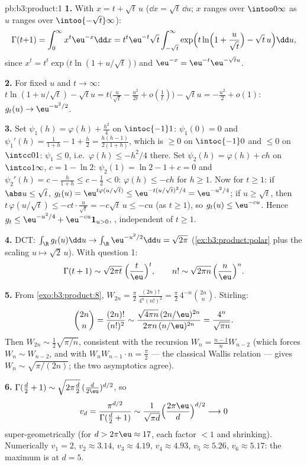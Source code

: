 \begin{solution}{pb:b3:product:1}
\textbf{1.} With $x = t + \sqrt t\,u$ ($\dd x = \sqrt
t\,\dd u$; $x$ ranges over $\intoo0\infty$ as $u$ ranges over
$\intoo{-\sqrt t}\infty$):
\[
\Gamma(t{+}1) = \int_0^\infty x^t\eu^{-x}\dd x
= t^t\eu^{-t}\sqrt t\int_{-\sqrt t}^{\infty}
\exp\Bigl(t\ln\Bigl(1 + \frac u{\sqrt t}\Bigr) - \sqrt
t\,u\Bigr)\dd u,
\]
since $x^t = t^t\exp\bigl(t\ln(1 + u/\sqrt t)\bigr)$ and
$\eu^{-x} = \eu^{-t}\eu^{-\sqrt tu}$.

\textbf{2.} For fixed $u$ and $t \to \infty$: $t\ln(1 +
u/\sqrt t) - \sqrt tu = t\bigl(\frac u{\sqrt t} -
\frac{u^2}{2t} + o(\frac1t)\bigr) - \sqrt tu = -\frac{u^2}2 +
o(1)$: $g_t(u) \to \eu^{-u^2/2}$.

\textbf{3.} Set $\psi_1(h) = \varphi(h) + \frac{h^2}4$ on
$\intoc{-1}1$: $\psi_1(0) = 0$ and $\psi_1'(h) = \frac1{1+h} -
1 + \frac h2 = \frac{h(h-1)}{2(1+h)}$, which is $\geq 0$ on
$\intoc{-1}0$ and $\leq 0$ on $\intcc01$: $\psi_1 \leq 0$,
i.e.\ $\varphi(h) \leq -h^2/4$ there. Set $\psi_2(h) =
\varphi(h) + ch$ on $\intco1\infty$, $c = 1 - \ln2$: $\psi_2(1)
= \ln2 - 1 + c = 0$ and $\psi_2'(h) = c - \frac h{1+h} \leq c -
\frac12 < 0$: $\varphi(h) \leq -ch$ for $h \geq 1$. Now for $t
\geq 1$: if $\abs u \leq \sqrt t$, $g_t(u) =
\eu^{t\varphi(u/\sqrt t)} \leq \eu^{-t(u/\sqrt t)^2/4} =
\eu^{-u^2/4}$; if $u \geq \sqrt t$, then $t\,\varphi(u/\sqrt t) \leq
-ct\cdot\frac u{\sqrt t} = -c\sqrt t\,u \leq -cu$ (as $t \geq
1$), so $g_t(u) \leq \eu^{-cu}$. Hence $g_t \leq \eu^{-u^2/4} +
\eu^{-cu}\mathbf 1_{u>0}$, , independent of $t \geq
1$.

\textbf{4.} DCT: $\int_\R g_t(u)\dd u \to
\int_\R\eu^{-u^2/2}\dd u = \sqrt{2\pi}$
(\cref{ex:b3:product:polar} plus the scaling
$u\mapsto\sqrt2\,u$). With question 1:
\[
\Gamma(t + 1) \sim \sqrt{2\pi t}\;\Bigl(\frac
t\eu\Bigr)^t,\qquad
n! \sim \sqrt{2\pi n}\,\Bigl(\frac n\eu\Bigr)^n .
\]

\textbf{5.} From \cref{exo:b3:product:8}, $W_{2n} =
\frac\pi2\,\frac{(2n)!}{4^n(n!)^2} =
\frac\pi2\,4^{-n}\binom{2n}n$. Stirling:
\[
\binom{2n}{n} = \frac{(2n)!}{(n!)^2}
\sim \frac{\sqrt{4\pi n}\,(2n/\eu)^{2n}}
{2\pi n\,(n/\eu)^{2n}} = \frac{4^n}{\sqrt{\pi n}} .
\]
Then $W_{2n} \sim \frac12\sqrt{\pi/n}$, consistent with the
recursion $W_n = \frac{n-1}nW_{n-2}$ (which forces $W_n \sim
W_{n-2}$, and with $W_nW_{n-1}\cdot n = \frac\pi2$ --- the
classical Wallis relation --- gives $W_n \sim
\sqrt{\pi/(2n)}$; the two asymptotics agree).

\textbf{6.} $\Gamma(\frac d2 + 1) \sim \sqrt{2\pi\frac
d2}\,(\frac d{2\eu})^{d/2}$, so
\[
v_d = \frac{\pi^{d/2}}{\Gamma(\frac d2 + 1)}
\sim \frac{1}{\sqrt{\pi d}}\Bigl(\frac{2\pi\eu}
d\Bigr)^{d/2} \longrightarrow 0
\]
super-geometrically (for $d > 2\pi\eu \approx 17$, each factor
$< 1$ and shrinking). Numerically $v_1 = 2$, $v_2 \approx
3.14$, $v_3 \approx 4.19$, $v_4 \approx 4.93$, $v_5 \approx
5.26$, $v_6 \approx 5.17$: the maximum is at $d = 5$.


\end{solution}
